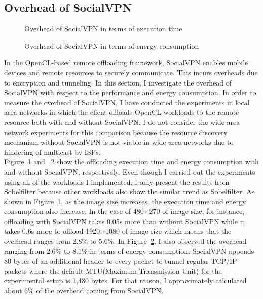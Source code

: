 \subsection{Overhead of SocialVPN}
\label{offloading:overhead_socialvpn}
%
\begin{figure}
\centering
{}
\caption{Overhead of SocialVPN in terms of execution time}
\label{fig:overhead_socialvpn1}
\end{figure}
%
\begin{figure}
\centering
{}
\caption{Overhead of SocialVPN in terms of energy consumption}
\label{fig:overhead_socialvpn2}
\end{figure}
%
In the OpenCL-based remote offloading framework, SocialVPN enables
mobile devices and remote resources to securely communicate.
%
This incurs overheads due to encryption and tunneling.
%
In this section, I investigate the overhead of SocialVPN with respect to
the performance and energy consumption.
%
In order to measure the overhead of SocialVPN, I have conducted the
experiments in local area networks in which the client offloads OpenCL
workloads to the remote resource both with and without SocialVPN.
%
I do not consider the wide area network experiments for this comparison
because the resource discovery mechanism without SocialVPN is not viable
in wide area networks due to hindering of multicast by ISPs.\\
%
Figure~\ref{fig:overhead_socialvpn1} and ~\ref{fig:overhead_socialvpn2}
show the offloading execution time and energy consumption with and
without SocialVPN, respectively.
%
Even though I carried out the experiments using all of the workloads
I implemented, I only present the results from Sobelfilter because
other workloads also show the similar trend as Sobelfilter.
%
As shown in Figure~\ref{fig:overhead_socialvpn1}, as the image size
increases, the execution time and energy consumption also increase.
%
In the case of 480$\times$270 of image size, for instance, offloading with
SocialVPN takes 0.05s more than without SocialVPN while it takes 0.6s
more to offload 1920$\times$1080 of image size which means that the
overhead ranges from 2.8\% to 5.6\%.
%
In Figure~\ref{fig:overhead_socialvpn2}, I also observed the overhead
ranging from 2.6\% to 8.1\% in terms of energy consumption.
%
SocialVPN appends 80 bytes of an additional header to every packet to
tunnel regular TCP/IP packets where the default MTU(Maximum Transmission
Unit) for the experimental setup is 1,480 bytes.
%
For that reason, I approximately calculated about 6\% of the overhead
coming from SocialVPN.
%

